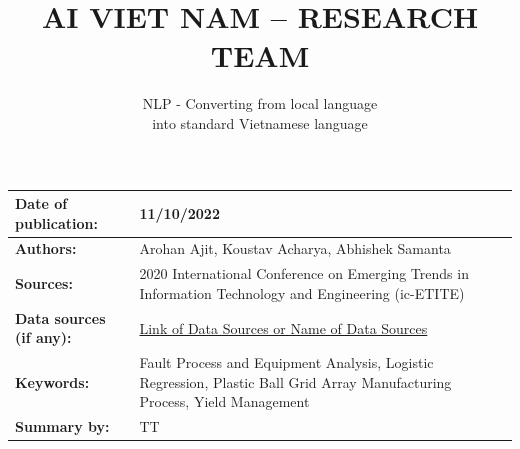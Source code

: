 \documentclass[11pt]{article}
\title{\LARGE AI VIET NAM – RESEARCH TEAM}
\author{\Huge NLP - Converting from local language \\ \Huge into standard Vietnamese language }
\begin{document}
\maketitle

\begin{tabular}{|p{4cm}|p{12cm}|}
 \hline
 \textbf{Date of publication:}
  &  11/10/2022 \\
\hline
 \textbf{Authors:}
  & Arohan Ajit, Koustav Acharya, Abhishek Samanta  \\
 \hline
 \textbf{Sources:} 
  & 2020 International Conference on Emerging Trends in Information Technology and Engineering (ic-ETITE)\\
 \hline
 \textbf{Data sources (if any):} 
  & \href{https://colab.research.google.com/drive/14lyQVNexfDAIqCBDxYhbe0FeslDkefBB?authuser=1}{Link of Data Sources or Name of Data Sources}\\
 \hline
 \textbf{Keywords:} 
  & Fault Process and Equipment Analysis, Logistic Regression, Plastic Ball Grid Array Manufacturing Process, Yield Management\\
 \hline
 \textbf{Summary by:} 
  & TT\\
 \hline
\end{tabular}
\end{document}

